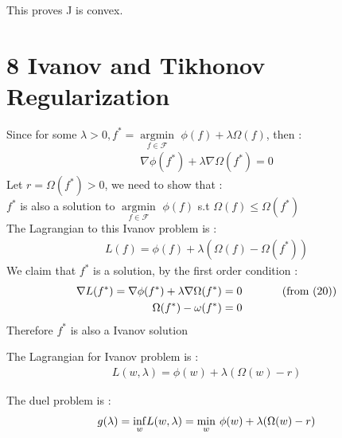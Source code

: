 \documentclass{article}
\newenvironment{problem}[2][$\bullet$]{\begin{trivlist}\large
		\item[\hskip \labelsep {\bfseries #1}\hskip \labelsep {\bfseries #2.}]}  {\end{trivlist}}
\newenvironment{sub}[2][$-$]{\begin{trivlist}
		\item[\hskip \labelsep {\bfseries #1}\hskip \labelsep {\bfseries #2.}]}  {\end{trivlist}}
\begin{document}
This proves J is convex. 

\section{8 Ivanov and Tikhonov Regularization}

\begin{problem}{8.1 Tikhnov optimal implies Ivanov optimal}
\end{problem}
\begin{sub}{8.1.1}
\end{sub}
Since for some $\lambda > 0, f^*  = \underset{f \in \mathcal{F}}{\operatorname{argmin}}$ $ \phi(f) +\lambda \Omega(f)$, then :
\begin{align}
\nabla \phi(f^*) + \lambda \nabla\Omega(f^*) =0
\end{align}
Let $r = \Omega(f^*) > 0$, we need to show that :\\
$f^*$ is also a solution to $\underset{f \in \mathcal{F}}{\operatorname{argmin}}$ $\phi(f)$ s.t $\Omega(f) \leq \Omega(f^*)$\\
The Lagrangian to this Ivanov problem is  :
\begin{align}
L(f) = \phi(f) + \lambda(\Omega(f) - \Omega(f^*))
\end{align}
We claim that $f^*$ is a solution, by the first order condition :
\begin{align}
\nabla L(f^*) = \nabla \phi(f^*) + \lambda \nabla\Omega(f^*) &= 0\hspace{0.5in } \text{(from (20))}\\
\Omega(f^*) - \omega(f^*) &= 0
\end{align}
Therefore $f^*$ is also a Ivanov solution

\begin{problem}{8.2 Ivanov optimal implies Tikhonov optimal }
\end{problem}
\begin{sub}{8.2.1}
\end{sub}
The Lagrangian for Ivanov problem is :
\begin{align}
L(w,\lambda) = \phi(w) + \lambda(\Omega(w) - r)
\end{align}

\pagebreak

\begin{sub}{8.2.2}
\end{sub}
The duel problem is :
\begin{align}
g(\lambda) = \underset{w}{\operatorname{inf}} L(w,\lambda) = \underset{w}{\operatorname{min}} \hspace{0.05in} \phi(w) + \lambda(\Omega(w) - r)  
\end{align} 
\end{document}
